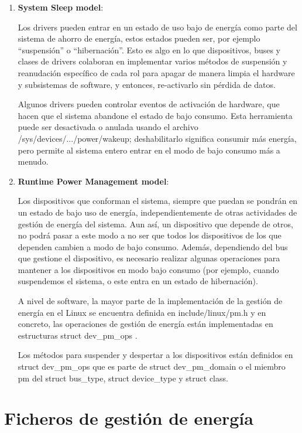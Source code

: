 \documentclass[12pt, spanish]{article}
\begin{document}
\begin{enumerate}


\item \textbf{System Sleep model}: 

\quad	Los drivers pueden entrar en un estado de uso bajo de energía como parte del sistema de ahorro de energía, estos estados pueden ser, por ejemplo “suspensión” o “hibernación”.
Esto es algo en lo que dispositivos, buses y clases de drivers colaboran en implementar varios métodos de suspensión y reanudación específico de cada rol para apagar de manera limpia el hardware y subsistemas de software, y entonces, re-activarlo sin pérdida de datos.

Algunos drivers pueden controlar eventos de activación de hardware, que hacen que el sistema abandone el estado de bajo consumo. Esta herramienta puede ser desactivada o anulada usando el archivo /sys/devices/.../power/wakeup; deshabilitarlo significa consumir más energía, pero permite al sistema entero entrar en el modo de bajo consumo más a menudo.


\item \textbf{Runtime Power Management model}:

\quad	 Los dispositivos que conforman el sistema, siempre que puedan se pondrán en un estado de bajo uso de energía, independientemente de otras actividades de gestión de energía del sistema. Aun así, un dispositivo que depende de otros, no podrá pasar a este modo a no ser que todos los dispositivos de los que dependen cambien a modo de bajo consumo. Además, dependiendo del bus que gestione el dispositivo, es necesario realizar algunas operaciones para mantener a los dispositivos en modo bajo consumo (por ejemplo, cuando suspendemos el sistema, o este entra en un estado de hibernación).

A nivel de software, la mayor parte de la implementación de la gestión de energía en el Linux se encuentra definida en include/linux/pm.h  y en concreto, las operaciones de gestión de energía están implementadas en estructuras  struct dev\_pm\_ops .


Los métodos para suspender y despertar a los dispositivos  están definidos en struct dev\_pm\_ops que es parte de struct dev\_pm\_domain o el miembro pm del struct bus\_type, struct device\_type y struct class.


\end{enumerate}


\section{Ficheros de gestión de energía}
\end{document}
